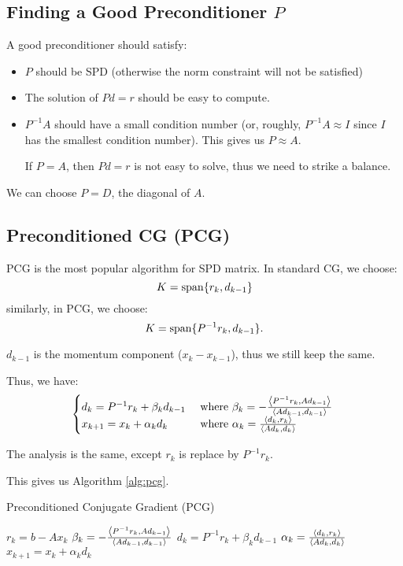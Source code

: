 \documentclass[../main/main.tex]{subfiles}
\begin{document}
\subsection{Finding a Good Preconditioner $P$}
A good preconditioner should satisfy:
\begin{itemize}
\item $P$ should be SPD (otherwise the norm constraint will not be satisfied)
  \item  The solution of $Pd = r$ should be easy to compute.
\item $P^{-1}A$ should have a small condition number (or, roughly, $P^{-1}A\approx I$ since $I$ has the smallest condition number). This gives us $P\approx A$.
        \begin{remark}
If $P = A$, then $Pd = r$ is not easy to solve, thus we need to strike a balance.
        \end{remark}
\end{itemize}

\begin{example}
We can choose $P=D$, the diagonal of $A$.
\end{example}

\subsection{Preconditioned CG (PCG)}
PCG is the most popular algorithm for SPD matrix. In standard CG, we choose: \[
  K = \operatorname{span} \{r_{k}, d_{k-1}\}
\] similarly, in PCG, we choose: \[
  K = \operatorname{span} \{P ^{-1} r_{k}, d_{k-1}\}.
\]
\begin{remark}
 $d_{k-1}$ is the momentum component ($x_{k}-x_{k-1}$), thus we still keep the same.
\end{remark}

Thus, we have: \[
  \begin{cases}
    d_{k}= P^{-1} r_{k}+\beta_{k}d_{k-1}& \text{ where $\beta_{k} = - \frac{\left\langle{P^{-1}r_{k}},{Ad_{k-1}}\right\rangle}{\left\langle{Ad_{k-1}},{d_{k-1}}\right\rangle} $ }\\
    x_{k+1} = x_{k}+\alpha_{k}d_{k} &\text{ where $\alpha_{k}= \frac{\left\langle{d_{k}},{r_{k}}\right\rangle}{\left\langle{Ad_{k}},{d_{k}}\right\rangle} $ }
  \end{cases}
\]
\begin{remark}
The analysis is the same, except $r_{k}$ is replace by $P^{-1}r_{k}$.
\end{remark}
This gives us Algorithm \ref{alg:pcg}.
\begin{algorithm}[h!]
  \caption{Preconditioned Conjugate Gradient (PCG)}\label{alg:pcg}
  \begin{algorithmic}[1]
   \State $r_{k}=b-Ax_{k}$
   \State $\beta_{k}= - \frac{\left\langle{P^{-1}r_{k}},{Ad_{k-1}}\right\rangle}{\left\langle{Ad_{k-1}},{d_{k-1}}\right\rangle} $
   \State $d_{k}=P^{-1}r_{k}+\beta_{k}d_{k-1}$
   \State $\alpha_{k}= \frac{\left\langle{d_{k}},{r_{k}}\right\rangle}{\left\langle{Ad_{k}},{d_{k}}\right\rangle} $
   \State $x_{k+1}=x_{k}+\alpha_{k}d_{k}$
   \EndFor
  \end{algorithmic}
\end{algorithm}
\end{document}
